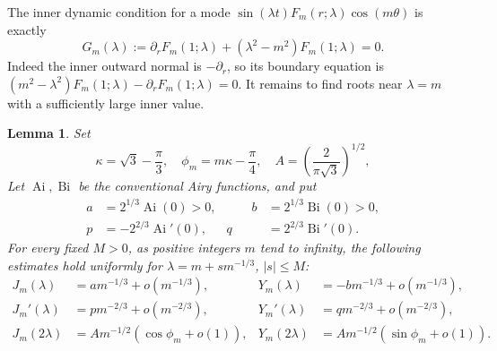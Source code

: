 \documentclass[11pt]{article}
\newtheorem{lemma}{Lemma}
\newcommand{\Ai}{\operatorname{Ai}}
\newcommand{\Bi}{\operatorname{Bi}}
\begin{document}
The inner dynamic condition for a mode
\(\sin(\lambda t)F_m(r;\lambda)\cos(m\theta)\) is exactly
\begin{equation}\label{eq:G}
G_m(\lambda):=\partial_rF_m(1;\lambda)
+(\lambda^2-m^2)F_m(1;\lambda)=0.
\end{equation}
Indeed the inner outward normal is \(-\partial_r\), so its boundary
equation is \((m^2-\lambda^2)F_m(1;\lambda)
-\partial_rF_m(1;\lambda)=0\). It remains to find roots near \(\lambda=m\)
with a sufficiently large inner value.

\begin{lemma}\label{lem:shift}
Set
\[
\kappa=\sqrt3-\frac{\pi}{3},\quad
\phi_m=m\kappa-\frac{\pi}{4},\quad
A=\left(\frac{2}{\pi\sqrt3}\right)^{1/2},
\]
Let \(\Ai,\Bi\) be the conventional Airy functions, and put
\[
\begin{aligned}
a&=2^{1/3}\Ai(0)>0,&\qquad b&=2^{1/3}\Bi(0)>0,\\
p&=-2^{2/3}\Ai'(0),& q&=2^{2/3}\Bi'(0).
\end{aligned}
\]
For every fixed \(M>0\), as positive integers \(m\) tend to infinity,
the following estimates hold uniformly for
\(\lambda=m+s m^{-1/3}\), \(|s|\le M\):
\begin{align}
J_m(\lambda)&=a m^{-1/3}+o(m^{-1/3}),&
Y_m(\lambda)&=-b m^{-1/3}+o(m^{-1/3}),\label{eq:inner-values}\\
J_m'(\lambda)&=p m^{-2/3}+o(m^{-2/3}),&
Y_m'(\lambda)&=q m^{-2/3}+o(m^{-2/3}),\label{eq:inner-derivatives}\\
J_m(2\lambda)&=A m^{-1/2}(\cos\phi_m+o(1)),&
Y_m(2\lambda)&=A m^{-1/2}(\sin\phi_m+o(1)).\label{eq:outer-values}
\end{align}
\end{lemma}
\end{document}
